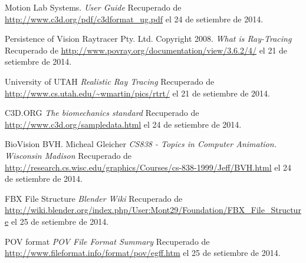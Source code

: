 \documentclass[11pt,letterpaper]{article}     %
\begin{document}
\begin{thebibliography}{5}
 Motion Lab Systems. \textit{User Guide} Recuperado de \url{http://www.c3d.org/pdf/c3dformat_ug.pdf} el 24 de setiembre de 2014.

 Persistence of Vision Raytracer Pty. Ltd. Copyright 2008. \textit{What is Ray-Tracing} Recuperado de \url{http://www.povray.org/documentation/view/3.6.2/4/} el 21 de setiembre de 2014.


 University of UTAH \textit{ Realistic Ray Tracing} Recuperado de \url{http://www.cs.utah.edu/~wmartin/pics/rtrt/} el 21 de setiembre de 2014.

 C3D.ORG \textit{The biomechanics standard} Recuperado de \url{http://www.c3d.org/sampledata.html} el 24 de setiembre de 2014.

 BioVision BVH. Micheal Gleicher  \textit{CS838 - Topics in Computer Animation. Wisconsin Madison} Recuperado de \url{http://research.cs.wisc.edu/graphics/Courses/cs-838-1999/Jeff/BVH.html} el 24 de setiembre de 2014.

 FBX File Structure  \textit{Blender Wiki} Recuperado de \url{http://wiki.blender.org/index.php/User:Mont29/Foundation/FBX_File_Structure} el 25 de setiembre de 2014.

 POV format  \textit{POV File Format Summary
	} Recuperado de \url{http://www.fileformat.info/format/pov/egff.htm} el 25 de setiembre de 2014.

\end{thebibliography} 
\end{document}
